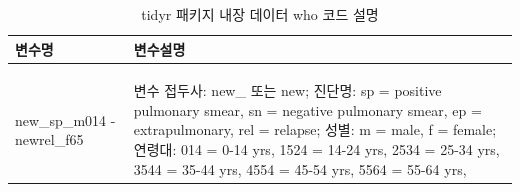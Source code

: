 \documentclass[
  11pt,
]{krantz}
\begin{document}
\begin{table}[H]

\caption{\label{tab:unnamed-chunk-91}tidyr 패키지 내장 데이터 who 코드 설명}
\centering
\fontsize{11}{13}\selectfont
\begin{tabu} to 
\toprule
변수명 & 변수설명\\
\midrule
{}   & \\
 & \\
   & \\
new\_sp\_m014 - newrel\_f65 & 변수 접두사: new\_ 또는 new;
            진단명: sp = positive pulmonary smear,
            sn = negative pulmonary smear,
            ep = extrapulmonary, rel = relapse;
            성별: m = male, f = female;
            연령대: 014 = 0-14 yrs,
            1524 = 14-24 yrs,
            2534 = 25-34 yrs,
            3544 = 35-44 yrs,
            4554 = 45-54 yrs,
            5564 = 55-64 yrs,
\\
\bottomrule
\end{tabu}
\end{table}

\normalsize
\end{document}
